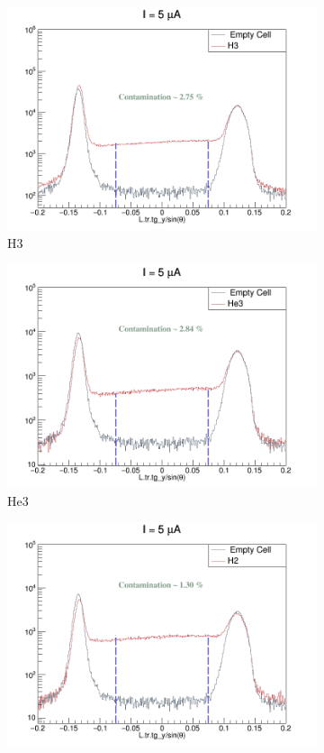 \documentclass[11pt]{article}
\begin{document}
\begin{enumerate}
\begin{itemize}
{\begin{figure}[H]
\centering
\begin{subfigure}{.4\textwidth}
\centering
 \includegraphics[width=\linewidth]{bk5_H3.png}
  \caption{H3}
\end{subfigure}
\begin{subfigure}{.4\textwidth}
 \includegraphics[width=\linewidth]{bk5_He3.png}
  \caption{He3}
\end{subfigure}
\begin{subfigure}{.4\textwidth}
\centering
 \includegraphics[width=\linewidth]{bk5_H2.png}

\end{subfigure}
\end{figure}}
\end{itemize}
\end{enumerate}
\end{document}
